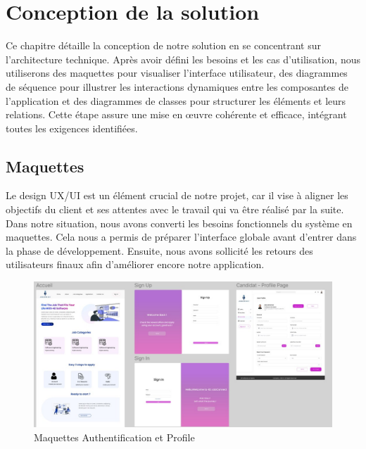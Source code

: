 

\chapter{Conception de la solution}
\pagestyle{chapterstyle}
Ce chapitre détaille la conception de notre solution en se 
concentrant sur l'architecture technique. Après avoir défini les 
besoins et les cas d'utilisation, nous utiliserons des maquettes 
pour visualiser l'interface utilisateur, des diagrammes de séquence 
pour illustrer les interactions dynamiques entre les composantes 
de l'application et des diagrammes de classes pour structurer les 
éléments et leurs relations. Cette étape assure une mise en œuvre 
cohérente et efficace, intégrant toutes les exigences identifiées.

\newpage
\vspace{1cm}


\section{Maquettes}
Le design UX/UI est un élément crucial de notre projet, 
car il vise à aligner les objectifs du client et ses attentes avec le travail qui va être réalisé par la suite.
\newline
Dans notre situation, nous avons converti les besoins fonctionnels du système en maquettes. Cela nous a permis de préparer l'interface globale avant d'entrer dans la phase de développement. Ensuite, nous avons sollicité les retours des utilisateurs finaux afin d'améliorer encore notre application.
\newline



\begin{figure}[htbp]
   \centering
   \includegraphics[scale=0.8]{Images/1.jpg} %
   \caption{Maquettes Authentification et Profile}
   \label{fig:maquette1}
\end{figure}
\vspace{1cm}

